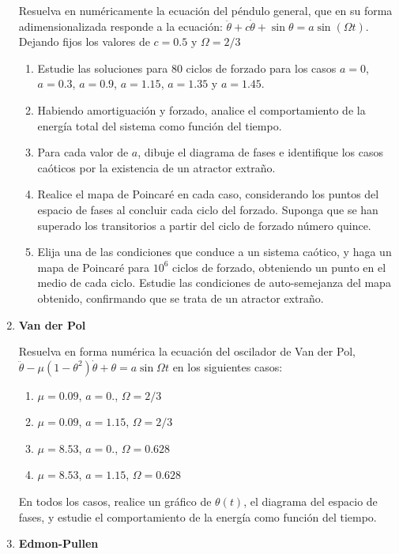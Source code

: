 \documentclass[a4paper,12pt]{article}
\begin{document}
\begin{enumerate}
    Resuelva en numéricamente la ecuación del péndulo general, que en su forma
    adimensionalizada responde a la ecuación: $\ddot \theta + c \dot \theta +
    \sin \theta = a \sin(\Omega t)$. Dejando fijos los valores de $c=0.5$ y
    $\Omega=2/3$
    \begin{enumerate} 
      \item Estudie las soluciones para 80 ciclos de forzado para los casos
        $a=0$, $a=0.3$, $a=0.9$, $a=1.15$, $a=1.35$ y $a=1.45$.
      \item Habiendo amortiguación y forzado, analice el comportamiento de la
        energía total del sistema como función del tiempo.
      \item Para cada valor de $a$, dibuje el diagrama de fases e identifique
        los casos caóticos por la existencia de un atractor extraño.
      \item Realice el mapa de Poincaré en cada caso, considerando los puntos
        del espacio de fases al concluir cada ciclo del forzado. Suponga que se
        han superado los transitorios a partir del ciclo de forzado número
        quince.
      \item Elija una de las condiciones que conduce a un sistema caótico, y
        haga un mapa de Poincaré para $10^6$ ciclos de forzado, obteniendo un
        punto en el medio de cada ciclo. Estudie las condiciones de
        auto-semejanza del mapa obtenido, confirmando que se trata de un
        atractor extraño.  
    \end{enumerate}

  \item {\bf{Van der Pol}}

    Resuelva en forma numérica la ecuación del oscilador de Van der Pol, $\ddot
    \theta - \mu \left (1-\theta^2 \right ) \dot \theta + \theta = a \sin
    \Omega t$ en los siguientes casos:
    \begin{enumerate}
      \item $\mu=0.09$, $a=0.$, $\Omega = 2/3$
      \item $\mu=0.09$, $a=1.15$, $\Omega = 2/3$
      \item $\mu=8.53$, $a=0.$, $\Omega = 0.628$
      \item $\mu=8.53$, $a=1.15$, $\Omega = 0.628$
    \end{enumerate}
    En todos los casos, realice un gráfico de $\theta(t)$, el diagrama del
    espacio de fases, y estudie el comportamiento de la energía como función
    del tiempo.

  \item {\bf{Edmon-Pullen}}


\end{enumerate}
\end{document}
